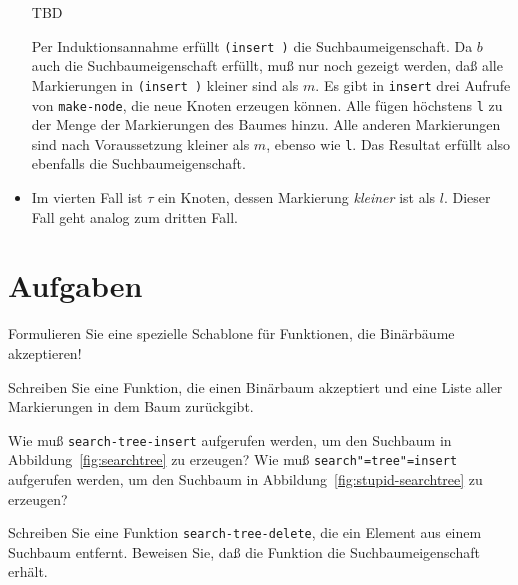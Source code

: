 \begin{beweis}
\begin{itemize}
  TBD
  
% 
  Per Induktionsannahme erfüllt \texttt{(insert )} die
  Suchbaumeigenschaft.  Da $b$ auch die Suchbaumeigenschaft
  erfüllt, muß nur noch gezeigt werden, daß alle Markierungen in
  \texttt{(insert )} kleiner sind als $m$.
  Es gibt in \texttt{insert} drei Aufrufe von \texttt{make-node},
  die neue Knoten erzeugen können.  Alle fügen höchstens
  \texttt{l} zu der Menge der Markierungen des Baumes hinzu.
  Alle anderen Markierungen sind nach Voraussetzung kleiner als $m$,
  ebenso wie \texttt{l}.  Das Resultat erfüllt also ebenfalls
  die Suchbaumeigenschaft.
\item Im vierten Fall ist $\tau$ ein Knoten, dessen Markierung
  \emph{kleiner} ist als $l$.  Dieser Fall geht analog zum
  dritten Fall.
\end{itemize}
\end{beweis}
%
\section*{Aufgaben}

\begin{aufgabe}
  \label{ex:recipe-trees}
  Formulieren Sie eine spezielle Schablone für Funktionen, die
  Binärbäume akzeptieren!
\end{aufgabe}

\begin{aufgabe}
  Schreiben Sie eine Funktion, die einen Binärbaum akzeptiert
  und eine Liste aller Markierungen in dem Baum zurückgibt.
\end{aufgabe}

\begin{aufgabe}
  Wie muß \texttt{search-tree-insert} aufgerufen werden, um den
  Suchbaum in Abbildung~\ref{fig:searchtree} zu erzeugen?  Wie muß
  \texttt{search"=tree"=insert} aufgerufen werden, um den Suchbaum in
  Abbildung~\ref{fig:stupid-searchtree} zu erzeugen?
\end{aufgabe}

\begin{aufgabe}
  Schreiben Sie eine Funktion \texttt{search-tree-delete}, die ein
  Element aus einem Suchbaum entfernt.  Beweisen Sie, daß die Funktion die
  Suchbaumeigenschaft erhält.
\end{aufgabe}

